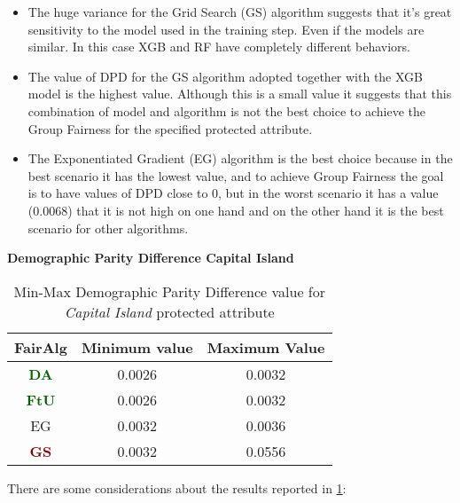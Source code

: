 \begin{itemize}
    \item The huge variance for the Grid Search (GS) algorithm suggests that it's great sensitivity to the model used in the training step. Even if the models are similar. In this case XGB and RF have completely different behaviors.

    \item The value of DPD for the GS algorithm adopted together with the XGB model is the highest value. Although this is a small value it suggests that this combination of model and algorithm is not the best choice to achieve the Group Fairness for the specified protected attribute.

    \item The Exponentiated Gradient (EG) algorithm is the best choice because in the best scenario it has the lowest value, and to achieve Group Fairness the goal is to have values of DPD close to 0, but in the worst scenario it has a value (0.0068) that it is not high on one hand and on the other hand it is the best scenario for other algorithms.

\end{itemize}


\textbf{Demographic Parity Difference Capital Island}
\begin{table}
    \centering
    \begin{tabular}{|c|c|c|}
        \hline
        \textbf{FairAlg} & \textbf{Minimum value} & \textbf{Maximum Value} \\
        \hline
        \textcolor{darkgreen}{\textbf{DA}} & 0.0026 & 0.0032 \\
        \hline
        \textcolor{darkgreen}{\textbf{FtU}} & 0.0026 & 0.0032 \\
        \hline
        EG & 0.0032 & 0.0036 \\
        \hline
        \textcolor{darkred}{\textbf{GS}} & 0.0032 & 0.0556 \\
        \hline
    \end{tabular}
    \caption{Min-Max Demographic Parity Difference value for \emph{Capital Island} protected attribute}
    \label{tab:ci_dpd}
\end{table}

There are some considerations about the results reported in \cref{tab:ci_dpd}:

